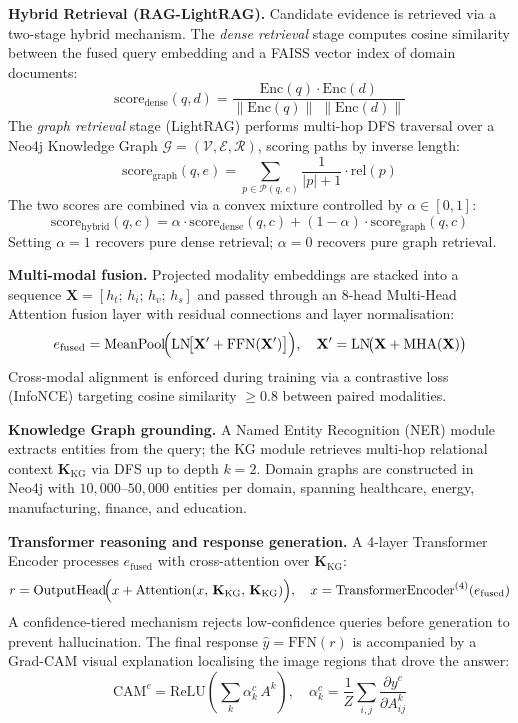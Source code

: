 \documentclass[12pt,a4paper]{article}
\begin{document}
\textbf{Hybrid Retrieval (RAG-LightRAG).}
Candidate evidence is retrieved via a two-stage hybrid mechanism. The \emph{dense
retrieval} stage computes cosine similarity between the fused query embedding and a
FAISS vector index of domain documents:
\[
  \mathrm{score}_{\mathrm{dense}}(q, d)
  = \frac{\mathrm{Enc}(q)\cdot\mathrm{Enc}(d)}
         {\|\mathrm{Enc}(q)\|\;\|\mathrm{Enc}(d)\|}
\]
The \emph{graph retrieval} stage (LightRAG) performs multi-hop DFS traversal over
a Neo4j Knowledge Graph $\mathcal{G} = (\mathcal{V}, \mathcal{E}, \mathcal{R})$,
scoring paths by inverse length:
\[
  \mathrm{score}_{\mathrm{graph}}(q, e)
  = \sum_{p \in \mathcal{P}(q,\,e)} \frac{1}{|p|+1}\cdot\mathrm{rel}(p)
\]
The two scores are combined via a convex mixture controlled by $\alpha \in [0,1]$:
\[
  \boxed{
    \mathrm{score}_{\mathrm{hybrid}}(q, c)
    = \alpha\cdot\mathrm{score}_{\mathrm{dense}}(q, c)
    + (1-\alpha)\cdot\mathrm{score}_{\mathrm{graph}}(q, c)
  }
\]
Setting $\alpha = 1$ recovers pure dense retrieval; $\alpha = 0$ recovers pure
graph retrieval.

\textbf{Multi-modal fusion.}
Projected modality embeddings are stacked into a sequence
$\mathbf{X} = [h_t;\, h_i;\, h_v;\, h_s]$ and passed through an 8-head
Multi-Head Attention fusion layer with residual connections and layer normalisation:
\[
  e_{\mathrm{fused}}
  = \mathrm{MeanPool}\!\Bigl(
      \mathrm{LN}\!\bigl[\mathbf{X}' + \mathrm{FFN}(\mathbf{X}')\bigr]
    \Bigr),
  \quad
  \mathbf{X}' = \mathrm{LN}\!\bigl(\mathbf{X} + \mathrm{MHA}(\mathbf{X})\bigr)
\]
Cross-modal alignment is enforced during training via a contrastive loss (InfoNCE)
targeting cosine similarity $\geq 0.8$ between paired modalities.

\textbf{Knowledge Graph grounding.}
A Named Entity Recognition (NER) module extracts entities from the query; the KG
module retrieves multi-hop relational context $\mathbf{K}_{\mathrm{KG}}$ via DFS
up to depth $k = 2$. Domain graphs are constructed in Neo4j with $10{,}000$--$50{,}000$
entities per domain, spanning healthcare, energy, manufacturing, finance, and education.

\textbf{Transformer reasoning and response generation.}
A 4-layer Transformer Encoder processes $e_{\mathrm{fused}}$ with cross-attention
over $\mathbf{K}_{\mathrm{KG}}$:
\[
  r = \mathrm{OutputHead}\!\Bigl(
        x + \mathrm{Attention}(x,\, \mathbf{K}_{\mathrm{KG}},\, \mathbf{K}_{\mathrm{KG}})
      \Bigr),
  \quad
  x = \mathrm{TransformerEncoder}^{(4)}(e_{\mathrm{fused}})
\]
A confidence-tiered mechanism rejects low-confidence queries before generation to
prevent hallucination. The final response $\hat{y} = \mathrm{FFN}(r)$ is accompanied
by a Grad-CAM visual explanation localising the image regions that drove the answer:
\[
  \mathrm{CAM}^c
  = \mathrm{ReLU}\!\left(\sum_k \alpha_k^c\, A^k\right),
  \quad
  \alpha_k^c = \frac{1}{Z}\sum_{i,j}
    \frac{\partial y^c}{\partial A_{ij}^k}
\]
\end{document}
